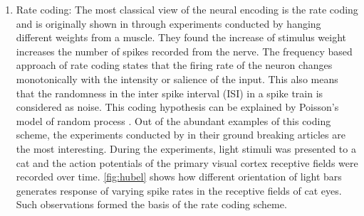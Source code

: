 \begin{enumerate}
	\item Rate coding: The most classical view of the neural encoding is the rate coding and is originally shown in \citet{adrian1926impulses} through experiments conducted by hanging different weights from a muscle. They found the increase of stimulus weight increases the number of spikes recorded from the nerve. The frequency based approach of rate coding states that the firing rate of the neuron changes monotonically with the intensity or salience of the input. This also means that the randomness in the inter spike interval (ISI) in a spike train is considered as noise. This coding hypothesis can be explained by Poisson's model of random process \citep{pachitariuprobabilistic}. Out of the abundant examples of this coding scheme, the experiments conducted by \citep{hubel1959receptive, hubel1962receptive} in their ground breaking articles are the most interesting. During the experiments, light stimuli was presented to a cat and the action potentials of the primary visual cortex receptive fields were recorded over time. \figurename \ref{fig:hubel} shows how different orientation of light bars generates response of varying spike rates in the receptive fields of cat eyes. Such observations formed the basis of the rate coding scheme. 
	

\end{enumerate}
